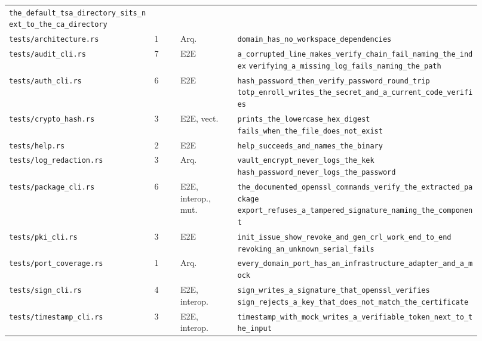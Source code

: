 \begin{longtable}{@{}L{0.285\linewidth}C{0.05\linewidth}L{0.115\linewidth}L{0.47\linewidth}@{}}
    \texttt{the\_default\_tsa\_directory\_sits\_next\_to\_the\_ca\_directory} \\
  \texttt{tests/architecture.rs} & 1 & Arq. & \texttt{domain\_has\_no\_workspace\_dependencies} \\
  \texttt{tests/audit\_cli.rs} & 7 & E2E & \texttt{a\_corrupted\_line\_makes\_verify\_chain\_fail\_naming\_the\_index}\newline
    \texttt{verifying\_a\_missing\_log\_fails\_naming\_the\_path} \\
  \texttt{tests/auth\_cli.rs} & 6 & E2E & \texttt{hash\_password\_then\_verify\_password\_round\_trip}\newline
    \texttt{totp\_enroll\_writes\_the\_secret\_and\_a\_current\_code\_verifies} \\
  \texttt{tests/crypto\_hash.rs} & 3 & E2E, vect. & \texttt{prints\_the\_lowercase\_hex\_digest}\newline
    \texttt{fails\_when\_the\_file\_does\_not\_exist} \\
  \texttt{tests/help.rs} & 2 & E2E & \texttt{help\_succeeds\_and\_names\_the\_binary} \\
  \texttt{tests/log\_redaction.rs} & 3 & Arq. & \texttt{vault\_encrypt\_never\_logs\_the\_kek}\newline
    \texttt{hash\_password\_never\_logs\_the\_password} \\
  \texttt{tests/package\_cli.rs} & 6 & E2E, interop., mut. & \texttt{the\_documented\_openssl\_commands\_verify\_the\_extracted\_package}\newline
    \texttt{export\_refuses\_a\_tampered\_signature\_naming\_the\_component} \\
  \texttt{tests/pki\_cli.rs} & 3 & E2E & \texttt{init\_issue\_show\_revoke\_and\_gen\_crl\_work\_end\_to\_end}\newline
    \texttt{revoking\_an\_unknown\_serial\_fails} \\
  \texttt{tests/port\_coverage.rs} & 1 & Arq. & \texttt{every\_domain\_port\_has\_an\_infrastructure\_adapter\_and\_a\_mock} \\
  \texttt{tests/sign\_cli.rs} & 4 & E2E, interop. & \texttt{sign\_writes\_a\_signature\_that\_openssl\_verifies}\newline
    \texttt{sign\_rejects\_a\_key\_that\_does\_not\_match\_the\_certificate} \\
  \texttt{tests/timestamp\_cli.rs} & 3 & E2E, interop. & \texttt{timestamp\_with\_mock\_writes\_a\_verifiable\_token\_next\_to\_the\_input}\newline

\end{longtable}
